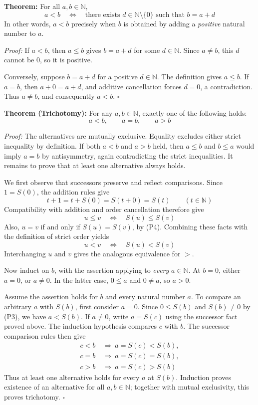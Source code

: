 \documentclass[a4paper,11pt,abstracton]{scrartcl}
\newcommand{\NN}{\mathbb{N}}
\newcommand{\rimply}{\Rightarrow}
\theoremstyle{dotlessP}
\theoremstyle{dotlessS}
\theoremstyle{remark}
\theoremstyle{definition}
\begin{document}
\begin{problem_box}
\textbf{Theorem:}
For all $a,b\in\NN$,
\[
    a<b
    \quad\Longleftrightarrow\quad
    \text{there exists }d\in\NN\setminus\{0\}\text{ such that }b=a+d
\]
In other words, $a<b$ precisely when $b$ is obtained by adding a
\emph{positive} natural number to $a$.
\end{problem_box}

\begin{claim_box}
\textit{Proof:}
If $a<b$, then $a\le b$ gives $b=a+d$ for some $d\in\NN$.
Since $a\ne b$, this $d$ cannot be $0$, so it is positive.

Conversely, suppose $b=a+d$ for a positive $d\in\NN$.
The definition gives $a\le b$. If $a=b$, then $a+0=a+d$, and
additive cancellation forces $d=0$, a contradiction.
Thus $a\ne b$, and consequently $a<b$.
\hfill$\square$
\end{claim_box}

\begin{problem_box}
\textbf{Theorem (Trichotomy):}
For any $a,b\in\NN$, exactly one of the following holds:
\[
    a<b,\qquad a=b,\qquad a>b
\]
\end{problem_box}

\begin{claim_box}
\textit{Proof:}
The alternatives are mutually exclusive. Equality excludes either strict
inequality by definition. If both $a<b$ and $a>b$ held, then $a\le b$
and $b\le a$ would imply $a=b$ by antisymmetry, again contradicting the
strict inequalities. It remains to prove that at least one alternative
always holds.

We first observe that successors preserve and reflect comparisons.
Since $1=S(0)$, the addition rules give
\[
    t+1=t+S(0)=S(t+0)=S(t)\qquad(t\in\NN)
\]
Compatibility with addition and order cancellation therefore give
\[
    u\le v\quad\Longleftrightarrow\quad S(u)\le S(v)
\]
Also, $u=v$ if and only if $S(u)=S(v)$, by (P4).
Combining these facts with the definition of strict order yields
\[
    u<v\quad\Longleftrightarrow\quad S(u)<S(v)
\]
Interchanging $u$ and $v$ gives the analogous equivalence for $>$.

Now induct on $b$, with the assertion applying to \emph{every}
$a\in\NN$. At $b=0$, either $a=0$, or $a\ne0$. In the latter case,
$0\le a$ and $0\ne a$, so $a>0$.

Assume the assertion holds for $b$ and every natural number $a$.
To compare an arbitrary $a$ with $S(b)$, first consider $a=0$.
Since $0\le S(b)$ and $S(b)\ne0$ by (P3), we have $a<S(b)$.
If $a\ne0$, write $a=S(c)$ using the successor fact proved above.
The induction hypothesis compares $c$ with $b$. The successor
comparison rules then give
\[
\begin{aligned}
    c<b&\ \rimply\ a=S(c)<S(b),\\
    c=b&\ \rimply\ a=S(c)=S(b),\\
    c>b&\ \rimply\ a=S(c)>S(b)
\end{aligned}
\]
Thus at least one alternative holds for every $a$ at $S(b)$.
Induction proves existence of an alternative for all $a,b\in\NN$;
together with mutual exclusivity, this proves trichotomy.
\hfill$\square$
\end{claim_box}
\end{document}
